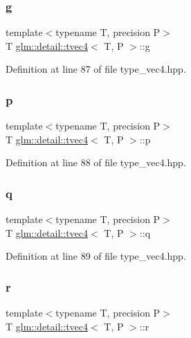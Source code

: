 \subsubsection{\texorpdfstring{g}{g}}
{\footnotesize\ttfamily template$<$typename T, precision P$>$ \\
T \hyperlink{structglm_1_1detail_1_1tvec4}{glm\+::detail\+::tvec4}$<$ T, P $>$\+::g}



Definition at line 87 of file type\+\_\+vec4.\+hpp.

\mbox{\label{structglm_1_1detail_1_1tvec4_a4feef51a7009aba3ff52f7a6bca31af6}} 
\subsubsection{\texorpdfstring{p}{p}}
{\footnotesize\ttfamily template$<$typename T, precision P$>$ \\
T \hyperlink{structglm_1_1detail_1_1tvec4}{glm\+::detail\+::tvec4}$<$ T, P $>$\+::p}



Definition at line 88 of file type\+\_\+vec4.\+hpp.

\mbox{\label{structglm_1_1detail_1_1tvec4_a5e51b506546f82affa04f4c2ebafdbdc}} 
\subsubsection{\texorpdfstring{q}{q}}
{\footnotesize\ttfamily template$<$typename T, precision P$>$ \\
T \hyperlink{structglm_1_1detail_1_1tvec4}{glm\+::detail\+::tvec4}$<$ T, P $>$\+::q}



Definition at line 89 of file type\+\_\+vec4.\+hpp.

\mbox{\label{structglm_1_1detail_1_1tvec4_a0536facf6079019db542c0f1a47e569c}} 
\subsubsection{\texorpdfstring{r}{r}}
{\footnotesize\ttfamily template$<$typename T, precision P$>$ \\
T \hyperlink{structglm_1_1detail_1_1tvec4}{glm\+::detail\+::tvec4}$<$ T, P $>$\+::r}



